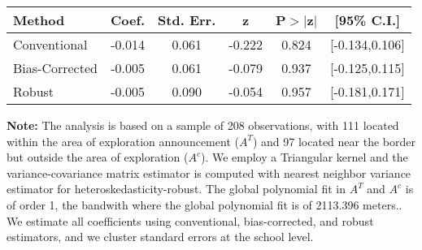 \begin{table}[htbp]\centering
 \footnotesize 
\begin{tabular}{lccccc}
\hline\hline
Method & Coef. & Std. Err. & z & P$>|$z$|$ & [95\% C.I.] \\ 
\hline \hline  
Conventional & -0.014 & 0.061 & -0.222 & 0.824 & [-0.134,0.106] \\ 
 Bias-Corrected & -0.005 & 0.061 & -0.079 & 0.937 & [-0.125,0.115] \\ 
Robust & -0.005 & 0.090 & -0.054 & 0.957 & [-0.181,0.171] \\ 
  \hline\hline
\end{tabular}
\label{table:rd}
\begin{tablenotes} 
  \justifying \tiny \textbf{Note: }    
   The analysis is based on a sample of 208 observations, with 111 located within the area of exploration announcement ($A^{T}$) and 97 located near the border but outside the area of exploration  ($A^{c}$). 
           We employ a Triangular kernel and the variance-covariance matrix estimator is computed with nearest neighbor variance estimator for heteroskedasticity-robust. The global polynomial fit in  $A^{T}$ and $A^{c}$ is of order 1, the bandwith where the global polynomial fit is of 2113.396 meters.. We estimate all coefficients using conventional, bias-corrected, and robust estimators, and we cluster standard errors at the school level. \end{tablenotes} 
 \end{table} 
